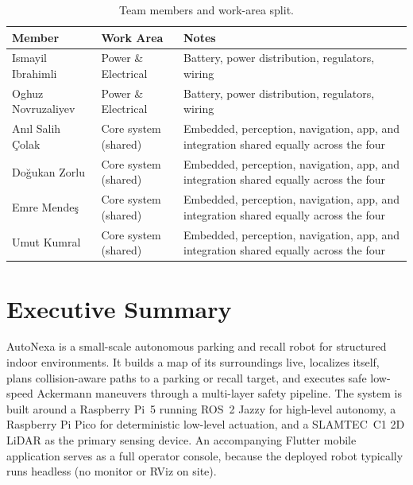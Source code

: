 \documentclass[12pt,a4paper]{report}
\newcommand{\pname}{AutoNexa}
\begin{document}
\begin{table}[H]
\centering
\caption{Team members and work-area split.}
\label{tab:roles}
\begin{tabularx}{\textwidth}{|p{4.2cm}|p{3.4cm}|X|}
\hline
\textbf{Member} & \textbf{Work Area} & \textbf{Notes} \\
\hline
Ismayil Ibrahimli & Power \& Electrical & Battery, power distribution, regulators, wiring \\
\hline
Oghuz Novruzaliyev & Power \& Electrical & Battery, power distribution, regulators, wiring \\
\hline
An\i{}l Salih \c{C}olak & Core system (shared) & Embedded, perception, navigation, app, and integration shared equally across the four \\
\hline
Do\u{g}ukan Zorlu & Core system (shared) & Embedded, perception, navigation, app, and integration shared equally across the four \\
\hline
Emre Mende\c{s} & Core system (shared) & Embedded, perception, navigation, app, and integration shared equally across the four \\
\hline
Umut Kumral & Core system (shared) & Embedded, perception, navigation, app, and integration shared equally across the four \\
\hline
\end{tabularx}
\end{table}

\chapter*{Executive Summary}

\pname{} is a small-scale autonomous parking and recall robot for structured
indoor environments. It builds a map of its surroundings live, localizes itself,
plans collision-aware paths to a parking or recall target, and executes safe
low-speed Ackermann maneuvers through a multi-layer safety pipeline. The system
is built around a Raspberry Pi~5 running ROS~2 Jazzy for high-level autonomy, a
Raspberry Pi Pico for deterministic low-level actuation, and a SLAMTEC~C1 2D
LiDAR as the primary sensing device. An accompanying Flutter mobile application
serves as a full operator console, because the deployed robot typically runs
headless (no monitor or RViz on site).
\end{document}
